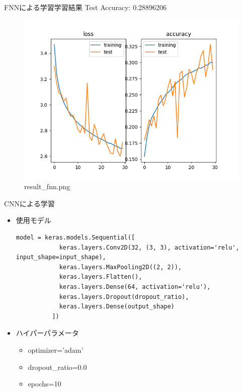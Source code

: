 \documentclass[uplatex, dvipdfmx]{beamer}
\begin{document}
  \begin{frame}{FNNによる学習学習結果}
    Test Accuracy: 0.28896206
    \begin{figure}[H]
      \centering
      \includegraphics[keepaspectratio, scale=0.5]{images/train_fnn.png}
      \caption{result\_fnn.png}
    \end{figure}
  \end{frame}

  \begin{frame}[fragile]{CNNによる学習}
    \begin{itemize}
      \item 使用モデル\mbox{}\\
        \begin{lstlisting}[caption=generate\_simple\_fnn.py]
          model = keras.models.Sequential([
            keras.layers.Conv2D(32, (3, 3), activation='relu', input_shape=input_shape),
            keras.layers.MaxPooling2D((2, 2)),
            keras.layers.Flatten(),
            keras.layers.Dense(64, activation='relu'),
            keras.layers.Dropout(dropout_ratio),
            keras.layers.Dense(output_shape)
          ])
        \end{lstlisting}
      \item ハイパーパラメータ\mbox{}\\
      \begin{itemize}
        \item optimizer='adam'
        \item dropout\_ratio=0.0
        \item epochs=10
      \end{itemize}
    \end{itemize}
  \end{frame}  
\end{document}

